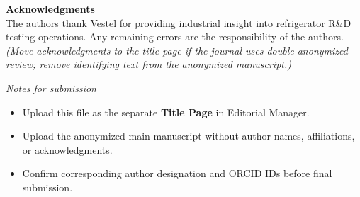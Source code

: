 \documentclass[11pt]{article}
\begin{document}
\vspace{0.7em}

\noindent
\textbf{Acknowledgments}\\
The authors thank Vestel for providing industrial insight into refrigerator R\&D testing operations. Any remaining errors are the responsibility of the authors.\\
\textit{(Move acknowledgments to the title page if the journal uses double-anonymized review; remove identifying text from the anonymized manuscript.)}

\vspace{1.2em}

\noindent
\textit{Notes for submission}\\
\begin{itemize}
    \item Upload this file as the separate \textbf{Title Page} in Editorial Manager.
    \item Upload the anonymized main manuscript without author names, affiliations, or acknowledgments.
    \item Confirm corresponding author designation and ORCID IDs before final submission.
\end{itemize}
\end{document}
